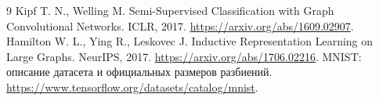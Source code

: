 \documentclass[11pt,a4paper]{article}
\begin{document}
\begin{thebibliography}{9}\small
{} Kipf T. N., Welling M. Semi-Supervised Classification with Graph Convolutional Networks.
ICLR, 2017. \url{https://arxiv.org/abs/1609.02907}.
 Hamilton W. L., Ying R., Leskovec J. Inductive Representation Learning on Large Graphs.
NeurIPS, 2017. \url{https://arxiv.org/abs/1706.02216}.
 MNIST: описание датасета и официальных размеров разбиений.
\url{https://www.tensorflow.org/datasets/catalog/mnist}.
\end{thebibliography}
\end{document}
